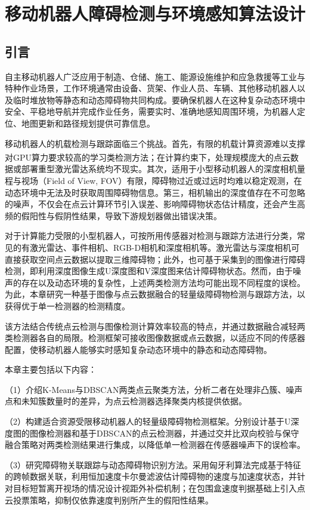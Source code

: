 \chapter{移动机器人障碍检测与环境感知算法设计}
\section{引言}
自主移动机器人广泛应用于制造、仓储、施工、能源设施维护和应急救援等工业与特种作业场景，工作环境通常由设备、货架、作业人员、车辆、其他移动机器人以及临时堆放物等静态和动态障碍物共同构成。要确保机器人在这种复杂动态环境中安全、平稳地导航并完成作业任务，需要实时、准确地感知周围环境，为机器人定位、地图更新和路径规划提供可靠信息。

移动机器人的机载检测与跟踪面临三个挑战。首先，有限的机载计算资源难以支撑对GPU算力要求较高的学习类检测方法\textsuperscript{\cite{10372107,9157234}}；在计算约束下，处理规模庞大的点云数据或部署重型激光雷达系统均不现实。其次，适用于小型移动机器人的深度相机量程与视场（Field of View, FOV）有限，障碍物过近或过远时均难以稳定观测，在动态环境中无法及时获取周围障碍物信息。第三，相机输出的深度值存在不可忽略的噪声，不仅会在点云计算环节引入误差、影响障碍物状态估计精度，还会产生高频的假阳性与假阴性结果，导致下游规划器做出错误决策。

对于计算能力受限的小型机器人，可按所用传感器对检测与跟踪方法进行分类，常见的有激光雷达、事件相机、RGB-D相机和深度相机等。激光雷达与深度相机可直接获取空间点云数据以提取三维障碍物；此外，也可基于采集到的图像进行障碍检测，即利用深度图像生成U深度图和V深度图来估计障碍物状态。然而，由于噪声的存在以及动态环境的复杂性，上述两类检测方法均可能出现不同程度的误检。为此，本章研究一种基于图像与点云数据融合的轻量级障碍物检测与跟踪方法，以获得优于单一检测器的检测精度。

该方法结合传统点云检测与图像检测计算效率较高的特点，并通过数据融合减轻两类检测器各自的局限。检测框架可接收图像数据或点云数据，以适应不同的传感器配置，使移动机器人能够实时感知复杂动态环境中的静态和动态障碍物。

本章主要包括以下内容：

（1）介绍K-Means与DBSCAN两类点云聚类方法，分析二者在处理非凸簇、噪声点和未知簇数量时的差异，为点云检测器选择聚类内核提供依据。

（2）构建适合资源受限移动机器人的轻量级障碍物检测框架。分别设计基于U深度图的图像检测器和基于DBSCAN的点云检测器，并通过交并比双向校验与保守融合策略对两类检测结果进行集成，以降低单一检测器在传感器噪声下的误检率。

（3）研究障碍物关联跟踪与动态障碍物识别方法。采用匈牙利算法完成基于特征的跨帧数据关联，利用恒加速度卡尔曼滤波估计障碍物的速度与加速度状态，并针对目标短暂离开视场的情况设计视距外补偿机制；在包围盒速度判据基础上引入点云投票策略，抑制仅依靠速度判别所产生的假阳性结果。

